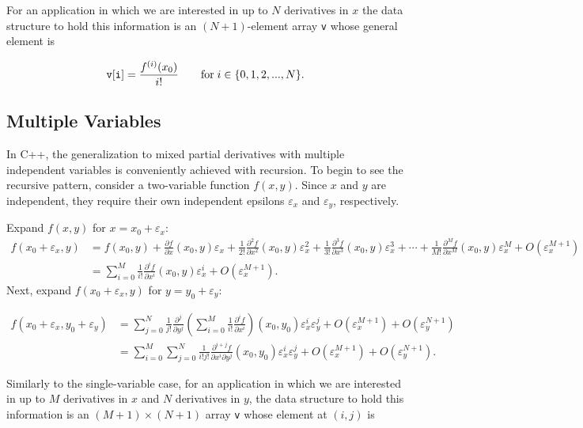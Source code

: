 \documentclass{article}
\begin{document}
For an application in which we are interested in up to $N$ derivatives in $x$ the data structure to hold
this information is an $(N+1)$-element array {\tt v} whose general element is

\[ {\tt v[i]} = \frac{f^{(i)}(x_0)}{i!} \qquad \text{for}\; i\in\{0,1,2,...,N\}. \]

\subsection{Multiple Variables}

In C++, the generalization to mixed partial derivatives with multiple independent variables is conveniently achieved
with recursion. To begin to see the recursive pattern, consider a two-variable function $f(x,y)$. Since $x$
and $y$ are independent, they require their own independent epsilons $\varepsilon_x$ and $\varepsilon_y$,
respectively.

Expand $f(x,y)$ for $x=x_0+\varepsilon_x$:
\begin{align*}
f(x_0+\varepsilon_x,y) &= f(x_0,y)
+ \frac{\partial f}{\partial x}(x_0,y)\varepsilon_x
+ \frac{1}{2!}\frac{\partial^2 f}{\partial x^2}(x_0,y)\varepsilon_x^2
+ \frac{1}{3!}\frac{\partial^3 f}{\partial x^3}(x_0,y)\varepsilon_x^3
+ \cdots
+ \frac{1}{M!}\frac{\partial^M f}{\partial x^M}(x_0,y)\varepsilon_x^M
+ O\left(\varepsilon_x^{M+1}\right) \\
&= \sum_{i=0}^M\frac{1}{i!}\frac{\partial^i f}{\partial x^i}(x_0,y)\varepsilon_x^i + O\left(\varepsilon_x^{M+1}\right).
\end{align*}
Next, expand $f(x_0+\varepsilon_x,y)$ for $y=y_0+\varepsilon_y$:

\begin{align*}
f(x_0+\varepsilon_x,y_0+\varepsilon_y) &= \sum_{j=0}^N\frac{1}{j!}\frac{\partial^j}{\partial y^j}
    \left(\sum_{i=0}^M\frac{1}{i!}\frac{\partial^if}{\partial x^i}\right)(x_0,y_0)\varepsilon_x^i\varepsilon_y^j
    + O\left(\varepsilon_x^{M+1}\right) + O\left(\varepsilon_y^{N+1}\right) \\
&= \sum_{i=0}^M\sum_{j=0}^N\frac{1}{i!j!}\frac{\partial^{i+j}f}{\partial x^i\partial y^j}(x_0,y_0)
   \varepsilon_x^i\varepsilon_y^j + O\left(\varepsilon_x^{M+1}\right) + O\left(\varepsilon_y^{N+1}\right).
\end{align*}

Similarly to the single-variable case, for an application in which we are interested in up to $M$ derivatives in
$x$ and $N$ derivatives in $y$, the data structure to hold this information is an $(M+1)\times(N+1)$
array {\tt v} whose element at $(i,j)$ is
\end{document}
